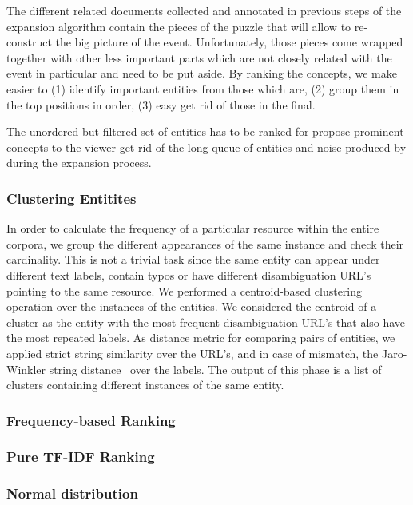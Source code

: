 \documentclass{llncs}
\begin{document}
The different related documents collected and annotated in previous steps of the expansion algorithm contain the pieces of the puzzle that will allow to re-construct the big picture of the event. Unfortunately, those pieces come wrapped together with other less important parts which are not closely related with the event in particular and need to be put aside. By ranking the concepts, we make easier to (1) identify important entities from those which are, (2) group them in the top positions in order, (3) easy get rid of those in the final.

The unordered but filtered set of entities has to be ranked for propose prominent concepts to the viewer get rid of the long queue of entities and noise produced by during the expansion process.

\subsubsection{Clustering Entitites}

In order to calculate the frequency of a particular resource within the entire corpora, we group the different appearances of the same instance and check their cardinality. This is not a trivial task since the same entity can appear under different text labels, contain typos or have different disambiguation URL's pointing to the same resource. We performed a centroid-based clustering operation over the instances of the entities. We considered the centroid of a cluster as the entity with the most frequent disambiguation URL's that also have the most repeated labels. As distance metric for comparing pairs of entities, we applied strict string similarity over the URL's, and in case of mismatch, the Jaro-Winkler string distance~\cite{winkler2006overview} over the labels. The output of this phase is a list of clusters containing different instances of the same entity.


\subsubsection{Frequency-based Ranking}

\subsubsection{Pure TF-IDF  Ranking}

\subsubsection{Normal distribution}
\end{document}
